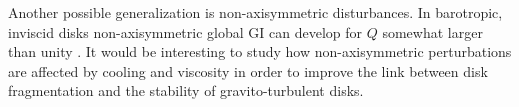 Another possible generalization is non-axisymmetric
disturbances. In barotropic, inviscid disks  
non-axisymmetric global GI can develop for $Q$ somewhat larger than unity
\citep{papaloizou89,adams89,papaloizou91}. It would be interesting to study
how non-axisymmetric perturbations are affected by cooling and
viscosity in order to improve %
the link between disk fragmentation and the
stability of gravito-turbulent disks.   



